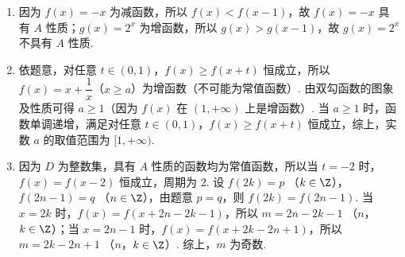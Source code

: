 \begin{solution}
\begin{enumerate}
\item 因为 \(f(x)=-x\) 为减函数，所以 \(f(x)<f(x-1)\)，故 \(f(x)=-x\) 具有 \(A\) 性质；\(g(x)=2^x\) 为增函数，所以 \(g(x)>g(x-1)\)，故 \(g(x)=2^x\) 不具有 \(A\) 性质.
\item 依题意，对任意 \(t\in(0,1)\)，\(f(x)\geq f(x+t)\) 恒成立，所以 \(f(x)=x+\dfrac{1}{x}\)（\(x\geq a\)）为增函数（不可能为常值函数）. 由双勾函数的图象及性质可得 \(a\geq1\)（因为 \(f(x)\) 在 \((1,+\infty)\) 上是增函数）. 当 \(a\geq1\) 时，函数单调递增，满足对任意 \(t\in(0,1)\)，\(f(x)\geq f(x+t)\) 恒成立，综上，实数 \(a\) 的取值范围为 \([1,+\infty)\).
\item 因为 \(D\) 为整数集，具有 \(A\) 性质的函数均为常值函数，所以当 \(t=-2\) 时，\(f(x)=f(x-2)\) 恒成立，周期为 \(2\). 设 \(f(2k)=p\) （\(k\in\Z\)），\(f(2n-1)=q\) （\(n\in\Z\)），由题意 \(p=q\)，则 \(f(2k)=f(2n-1)\). 当 \(x=2k\) 时，\(f(x)=f(x+2n-2k-1)\)，所以 \(m=2n-2k-1\) （\(n\)，\(k\in\Z\)）；当 \(x=2n-1\) 时，\(f(x)=f(x+2k-2n+1)\)，所以 \(m=2k-2n+1\) （\(n\)，\(k\in\Z\)）. 综上，\(m\) 为奇数.
\end{enumerate}
\end{solution}
